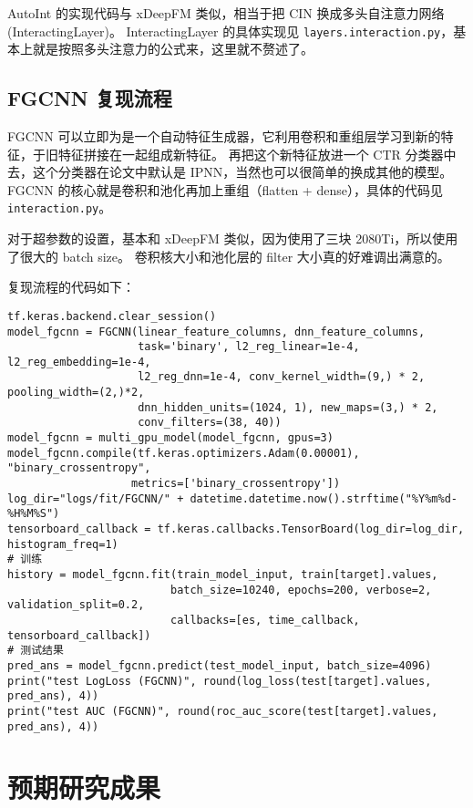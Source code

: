 \documentclass[degree=master,cjk-font=noto]{thuthesis}
\begin{document}
AutoInt 的实现代码与 xDeepFM 类似，相当于把 CIN 换成多头自注意力网络(InteractingLayer)。
InteractingLayer 的具体实现见 \texttt{layers.interaction.py}，基本上就是按照多头注意力的公式来，这里就不赘述了。

\section{FGCNN 复现流程}
\label{sec:fgcnn_reproduce}

FGCNN 可以立即为是一个自动特征生成器，它利用卷积和重组层学习到新的特征，于旧特征拼接在一起组成新特征。
再把这个新特征放进一个 CTR 分类器中去，这个分类器在论文中默认是 IPNN，当然也可以很简单的换成其他的模型。
FGCNN 的核心就是卷积和池化再加上重组（flatten + dense），具体的代码见 \texttt{interaction.py}。

对于超参数的设置，基本和 xDeepFM 类似，因为使用了三块 2080Ti，所以使用了很大的 batch size。
卷积核大小和池化层的 filter 大小真的好难调出满意的。

复现流程的代码如下：

  \begin{verbatim}
tf.keras.backend.clear_session()
model_fgcnn = FGCNN(linear_feature_columns, dnn_feature_columns,
                    task='binary', l2_reg_linear=1e-4, l2_reg_embedding=1e-4,
                    l2_reg_dnn=1e-4, conv_kernel_width=(9,) * 2, pooling_width=(2,)*2,
                    dnn_hidden_units=(1024, 1), new_maps=(3,) * 2,
                    conv_filters=(38, 40))
model_fgcnn = multi_gpu_model(model_fgcnn, gpus=3)
model_fgcnn.compile(tf.keras.optimizers.Adam(0.00001), "binary_crossentropy",
                   metrics=['binary_crossentropy'])
log_dir="logs/fit/FGCNN/" + datetime.datetime.now().strftime("%Y%m%d-%H%M%S")
tensorboard_callback = tf.keras.callbacks.TensorBoard(log_dir=log_dir, histogram_freq=1)
# 训练
history = model_fgcnn.fit(train_model_input, train[target].values,
                         batch_size=10240, epochs=200, verbose=2, validation_split=0.2,
                         callbacks=[es, time_callback, tensorboard_callback])
# 测试结果
pred_ans = model_fgcnn.predict(test_model_input, batch_size=4096)
print("test LogLoss (FGCNN)", round(log_loss(test[target].values, pred_ans), 4))
print("test AUC (FGCNN)", round(roc_auc_score(test[target].values, pred_ans), 4))
  \end{verbatim}

\chapter{预期研究成果}
\label{chap:result}
\end{document}
